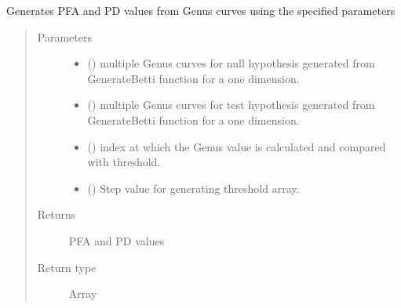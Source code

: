 \documentclass[letterpaper,10pt,english]{sphinxmanual}
\begin{document}
\begin{fulllineitems}
\label{\detokenize{rocGen:rocGen.GenusROC}}
\sphinxAtStartPar
Generates PFA and PD values from Genus curves using the specified parameters
\begin{quote}\begin{description}
\item[{Parameters}] \leavevmode\begin{itemize}
\item {} 
\sphinxAtStartPar
{} () \textendash{} multiple Genus curves for null hypothesis generated from GenerateBetti function for a one dimension.

\item {} 
\sphinxAtStartPar
{} () \textendash{} multiple Genus curves for test hypothesis generated from GenerateBetti function for a one dimension.

\item {} 
\sphinxAtStartPar
{} () \textendash{} index at which the Genus value is calculated and compared with threshold.

\item {} 
\sphinxAtStartPar
{} () \textendash{} Step value for generating threshold array.

\end{itemize}

\item[{Returns}] \leavevmode
\sphinxAtStartPar
PFA and PD values

\item[{Return type}] \leavevmode
\sphinxAtStartPar
Array

\end{description}\end{quote}

\end{fulllineitems}

\end{document}
